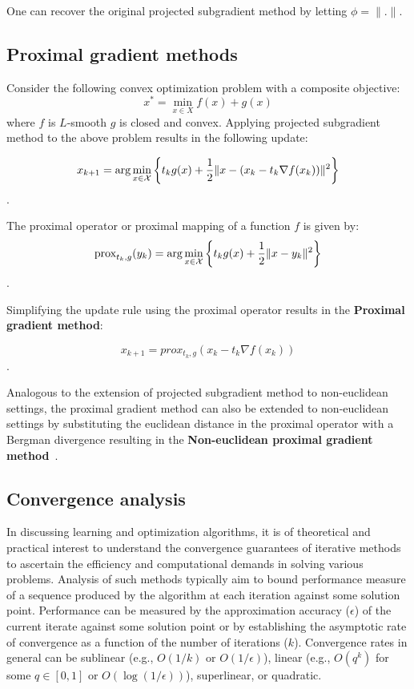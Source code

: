 One can recover the original projected subgradient method by letting $\phi=\|.
	\|$.

\subsection{Proximal gradient methods}
Consider the following convex optimization problem with a composite objective:
\begin{equation*}
	x^{\ast} = \min_{x \in X} f(x) + g(x)
\end{equation*} where $f$ is $L$-smooth $g$ is closed and
convex.
Applying projected subgradient method to the above problem results in the following update:

$$ x_{k+1} = \arg \min_{x \in \mathcal{X}} \left\{ t_k g(x) + \frac{1}{2} \| x - (x_k
	- t_k \nabla f(x_k)) \|^2 \right\}$$.

\begin{definition} The
	proximal operator or proximal mapping of a function $f$ is given by:
	$$\text{prox}_{t_k, g}(y_k) = \arg \min_{x \in \mathcal{X}} \left\{ t_k g(x) + \frac{1}{2}\| x - y_k \|^2 \right\} $$.
\end{definition}

Simplifying the update rule using the proximal operator results in the \textbf{Proximal gradient
	method}:

$$ x_{k+1} = prox_{t_k, g}(x_k - t_k \nabla f(x_k))$$.

Analogous to the extension of projected subgradient method to non-euclidean settings, the proximal
gradient method can also be extended to non-euclidean settings by substituting the euclidean
distance in the proximal operator with a Bergman divergence resulting in the \textbf{Non-euclidean
	proximal gradient method}~\cite{tsengApproximation2010,beckFirstOrder2017}.

\subsection{Convergence analysis}
In discussing learning and optimization algorithms, it is of theoretical and practical interest to
understand the convergence guarantees of iterative methods to ascertain the efficiency and
computational demands in solving various problems.
Analysis of such methods typically aim to bound performance measure of a sequence produced by the
algorithm at each iteration against some solution point.
Performance can be measured by the approximation accuracy ($\epsilon$) of the current iterate
against some solution point or by establishing the asymptotic rate of convergence as a function of
the number of iterations ($k$).
Convergence rates in general can be sublinear (e.g., $O(1/k)$ or $O(1/\epsilon)$), linear (e.g.,
$O(q^k)$ for some $q \in [0, 1]$ or $O(\log{(1/\epsilon)})$), superlinear, or quadratic.
